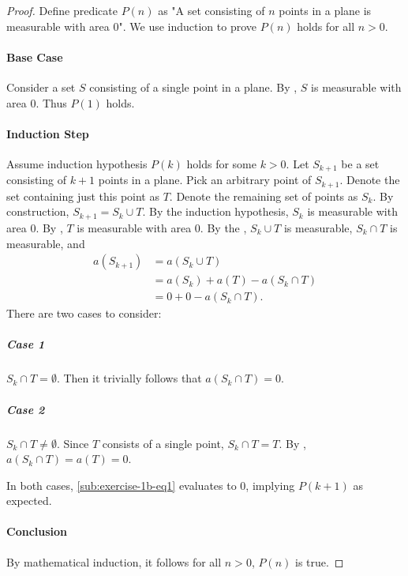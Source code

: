 \documentclass{article}
\begin{document}
\begin{proof}

  Define predicate $P(n)$ as "A set consisting of $n$ points in a plane is
    measurable with area $0$".
  We use induction to prove $P(n)$ holds for all $n > 0$.

  \paragraph{Base Case}%

    Consider a set $S$ consisting of a single point in a plane.
    By , $S$ is measurable with area $0$.
    Thus $P(1)$ holds.

  \paragraph{Induction Step}%

    Assume induction hypothesis $P(k)$ holds for some $k > 0$.
    Let $S_{k+1}$ be a set consisting of $k + 1$ points in a plane.
    Pick an arbitrary point of $S_{k+1}$.
    Denote the set containing just this point as $T$.
    Denote the remaining set of points as $S_k$.
    By construction, $S_{k+1} = S_k \cup T$.
    By the induction hypothesis, $S_k$ is measurable with area $0$.
    By , $T$ is measurable with area $0$.
    By the , $S_k \cup T$ is
      measurable, $S_k \cap T$ is measurable, and
      \begin{align}
        a(S_{k+1})
          & = a(S_k \cup T) \nonumber \\
          & = a(S_k) + a(T) - a(S_k \cap T) \nonumber \\
          & = 0 + 0 - a(S_k \cap T). \label{sub:exercise-1b-eq1}
      \end{align}
    There are two cases to consider:

    \subparagraph{Case 1}%

      $S_k \cap T = \emptyset$.
      Then it trivially follows that $a(S_k \cap T) = 0$.

    \subparagraph{Case 2}%

      $S_k \cap T \neq \emptyset$.
      Since $T$ consists of a single point, $S_k \cap T = T$.
      By , $a(S_k \cap T) = a(T) = 0$.

    \vspace{8pt}
    \noindent
    In both cases, \eqref{sub:exercise-1b-eq1} evaluates to $0$, implying
      $P(k + 1)$ as expected.

  \paragraph{Conclusion}%

    By mathematical induction, it follows for all $n > 0$, $P(n)$ is true.

\end{proof}
\end{document}

